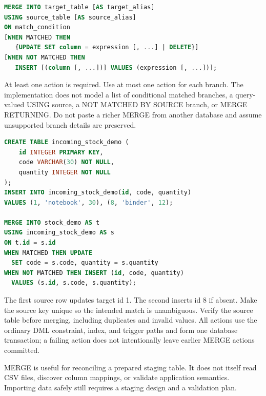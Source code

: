 \begin{lstlisting}[language=SQL]
MERGE INTO target_table [AS target_alias]
USING source_table [AS source_alias]
ON match_condition
[WHEN MATCHED THEN
   {UPDATE SET column = expression [, ...] | DELETE}]
[WHEN NOT MATCHED THEN
   INSERT [(column [, ...])] VALUES (expression [, ...])];
\end{lstlisting}

At least one action is required. Use at most one action for each branch. The implementation does not model a list of conditional matched branches, a query-valued USING source, a NOT MATCHED BY SOURCE branch, or MERGE RETURNING. Do not paste a richer MERGE from another database and assume unsupported branch details are preserved.

\begin{lstlisting}[language=SQL]
CREATE TABLE incoming_stock_demo (
    id INTEGER PRIMARY KEY,
    code VARCHAR(30) NOT NULL,
    quantity INTEGER NOT NULL
);
INSERT INTO incoming_stock_demo(id, code, quantity)
VALUES (1, 'notebook', 30), (8, 'binder', 12);

MERGE INTO stock_demo AS t
USING incoming_stock_demo AS s
ON t.id = s.id
WHEN MATCHED THEN UPDATE
  SET code = s.code, quantity = s.quantity
WHEN NOT MATCHED THEN INSERT (id, code, quantity)
  VALUES (s.id, s.code, s.quantity);
\end{lstlisting}

The first source row updates target id 1. The second inserts id 8 if absent. Make the source key unique so the intended match is unambiguous. Verify the source table before merging, including duplicates and invalid values. All actions use the ordinary DML constraint, index, and trigger paths and form one database transaction; a failing action does not intentionally leave earlier MERGE actions committed.

MERGE is useful for reconciling a prepared staging table. It does not itself read CSV files, discover column mappings, or validate application semantics. Importing data safely still requires a staging design and a validation plan.



